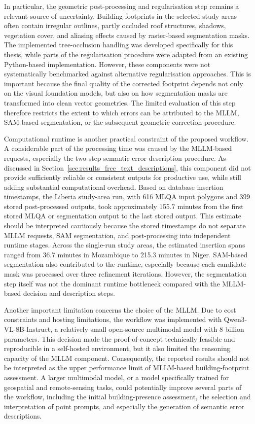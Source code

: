 In particular, the geometric post-processing and regularisation step remains a relevant source of uncertainty. Building footprints in the selected study areas often contain irregular outlines, partly occluded roof structures, shadows, vegetation cover, and aliasing effects caused by raster-based segmentation masks. The implemented tree-occlusion handling was developed specifically for this thesis, while parts of the regularisation procedure were adapted from an existing Python-based implementation. However, these components were not systematically benchmarked against alternative regularisation approaches. This is important because the final quality of the corrected footprint depends not only on the visual foundation models, but also on how segmentation masks are transformed into clean vector geometries. The limited evaluation of this step therefore restricts the extent to which errors can be attributed to the MLLM, SAM-based segmentation, or the subsequent geometric correction procedure.

Computational runtime is another practical constraint of the proposed workflow. A considerable part of the processing time was caused by the MLLM-based requests, especially the two-step semantic error description procedure. As discussed in Section~\ref{sec:results_free_text_descriptions}, this component did not provide sufficiently reliable or consistent outputs for productive use, while still adding substantial computational overhead. Based on database insertion timestamps, the Liberia study-area run, with 616 MLQA input polygons and 399 stored post-processed outputs, took approximately 155.7 minutes from the first stored MLQA or segmentation output to the last stored output. This estimate should be interpreted cautiously because the stored timestamps do not separate MLLM requests, SAM segmentation, and post-processing into independent runtime stages. Across the single-run study areas, the estimated insertion spans ranged from 36.7 minutes in Mozambique to 215.3 minutes in Niger. SAM-based segmentation also contributed to the runtime, especially because each candidate mask was processed over three refinement iterations. However, the segmentation step itself was not the dominant runtime bottleneck compared with the MLLM-based decision and description steps.

Another important limitation concerns the choice of the MLLM. Due to cost constraints and hosting limitations, the workflow was implemented with Qwen3-VL-8B-Instruct, a relatively small open-source multimodal model with 8 billion parameters. This decision made the proof-of-concept technically feasible and reproducible in a self-hosted environment, but it also limited the reasoning capacity of the MLLM component. Consequently, the reported results should not be interpreted as the upper performance limit of MLLM-based building-footprint assessment. A larger multimodal model, or a model specifically trained for geospatial and remote-sensing tasks, could potentially improve several parts of the workflow, including the initial building-presence assessment, the selection and interpretation of point prompts, and especially the generation of semantic error descriptions.

